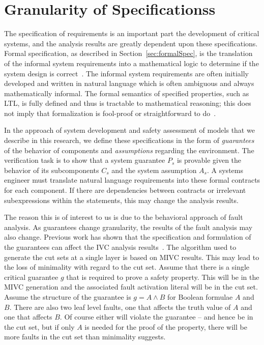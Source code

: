 \chapter{Granularity of Specificationss}
\label{chap:granularity}
The specification of requirements is an important part the development of critical systems, and the analysis results are greatly dependent upon these specifications. Formal specification, as described in Section~\ref{sec:formalSpec}, is the translation of the informal system requirements into a mathematical logic to determine if the system design is correct~\cite{hinchey2012industrial}. The informal system requirements are often initially developed and written in natural language which is often ambiguous and always mathematically informal. The formal semantics of specified properties, such as LTL, is fully defined and thus is tractable to mathematical reasoning; this does not imply that formalization is fool-proof or straightforward to do~\cite{kotonya1998requirements}. 

 In the approach of system development and safety assessment of models that we describe in this research, we define these specifications in the form of \emph{guarantees} of the behavior of components and \emph{assumptions} regarding the environment. The verification task is to show that a system guarantee $P_s$ is provable given the behavior of its subcomponents $C_s$ and the system assumption $A_s$. A systems engineer must translate natural language requirements into these formal contracts for each component. If there are dependencies between contracts or irrelevant subexpressions within the statements, this may change the analysis results. 
 
The reason this is of interest to us is due to the behavioral approach of fault analysis. As guarantees change granularity, the results of the fault analysis may also change. Previous work has shown that the specification and formulation of the guarantees can affect the IVC analysis results~\cite{ghassabani_2018}. The algorithm used to generate the cut sets at a single layer is based on MIVC results. This may lead to the loss of minimality with regard to the cut set.  Assume that there is a single critical guarantee $g$ that is required to prove a safety property. This will be in the MIVC generation and the associated fault activation literal will be in the cut set. Assume the structure of the guarantee is $g = A \land B$ for Boolean formulae $A$ and $B$. There are also two leaf level faults, one that affects the truth value of $A$ and one that affects $B$. Of course either will violate the guarantee -- and hence be in the cut set, but if only $A$ is needed for the proof of the property, there will be more faults in the cut set than minimality suggests. 


